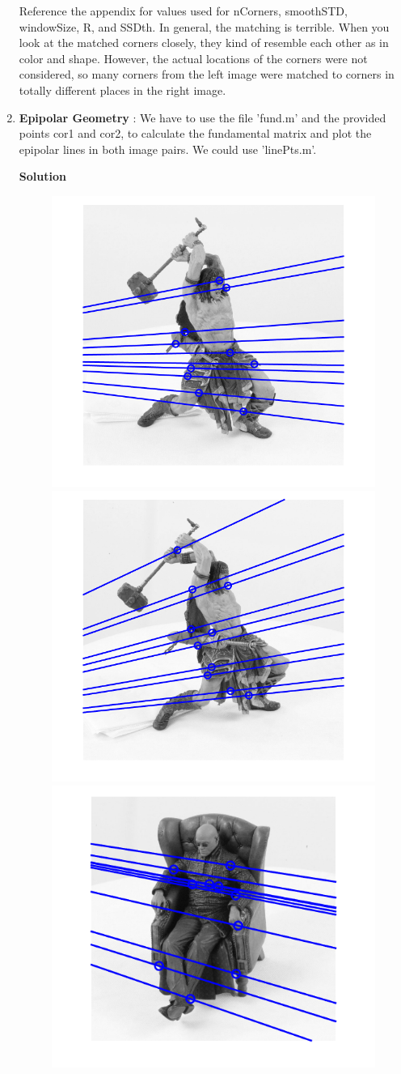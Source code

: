 \documentclass{assignment}
\begin{document}
\begin{problemlist}
\begin{enumerate}[label*=\arabic*.]
Reference the appendix for values used for nCorners, smoothSTD, windowSize, R, and SSDth. In general, the matching is terrible. When you look at the matched corners closely, they kind of resemble each other as in color and shape. However, the actual locations of the corners were not considered, so many corners from the left image were matched to corners in totally different places in the right image.\\

\item \textbf{Epipolar Geometry} : We have to use the file 'fund.m' and the provided points cor1 and cor2, to calculate the fundamental matrix and plot the epipolar lines in both image pairs. We could use 'linePts.m'.

\textbf{Solution}

\begin{figure}[H]
\centering
\includegraphics[width=0.45\columnwidth]{w6_4_1}
\includegraphics[width=0.45\columnwidth]{w6_4_2} \\
\includegraphics[width=0.45\columnwidth]{m6_4_1}

\end{figure}
\end{enumerate}
\end{problemlist}
\end{document}
